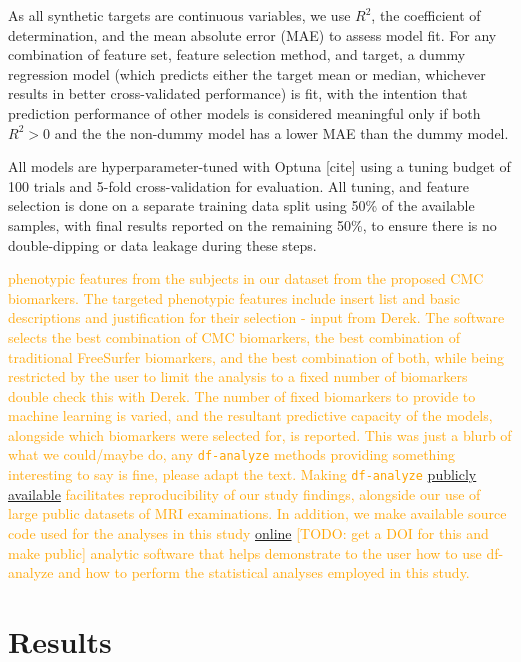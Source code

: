 \documentclass{article}
\begin{document}
As all synthetic targets are continuous variables, we use \(R^2\), the
coefficient of determination, and the mean absolute error (MAE) to assess
model fit. For any combination of feature set, feature selection method, and
target, a dummy regression model (which predicts either the target mean or
median, whichever results in better cross-validated performance) is fit, with
the intention that prediction performance of other models is considered
meaningful only if both \(R^2 > 0\) and the the non-dummy model has a lower MAE
than the dummy model.

All models are hyperparameter-tuned with Optuna [cite] using a tuning budget of
100 trials and 5-fold cross-validation for evaluation. All tuning, and feature
selection is done on a separate training data split using 50\% of the available
samples, with final results reported on the remaining 50\%, to ensure there is
no double-dipping or data leakage during these steps.



\textcolor{orange}{phenotypic features from the subjects in our dataset from
the proposed CMC biomarkers. The targeted phenotypic features include insert
list and basic descriptions and justification for their selection - input
from Derek. The software selects the best combination of CMC biomarkers, the
best combination of traditional FreeSurfer biomarkers, and the best
combination of both, while being restricted by the user to limit the analysis
to a fixed number of biomarkers double check this with Derek. The number of
fixed biomarkers to provide to machine learning is varied, and the resultant
predictive capacity of the models, alongside which biomarkers were selected
for, is reported. This was just a blurb of what we could/maybe do, any
\texttt{df-analyze} methods providing something interesting to say is fine,
please adapt the text. Making \texttt{df-analyze}
\href{https://github.com/stfxecutables/df-analyze}{publicly available}
facilitates reproducibility of our study findings, alongside our use of large
public datasets of MRI examinations. In addition, we make available source
code used for the analyses in this study
\href{https://github.com/stfxecutables/cortical_congruence}{online} [TODO:
get a DOI for this and make public] analytic software that helps demonstrate
to the user how to use df-analyze and how to perform the statistical analyses
employed in this study.}


\section{Results}
\end{document}
